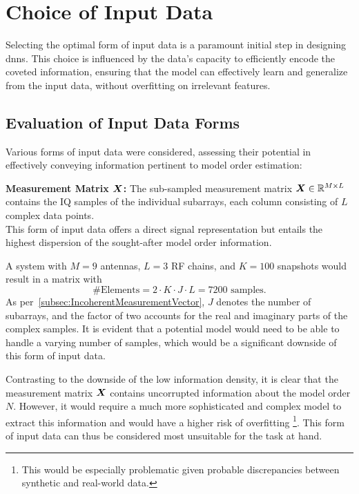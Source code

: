 \section{Choice of Input Data}

Selecting the optimal form of input data is a paramount initial step in designing \glspl{dnn}.
This choice is influenced by the data's capacity to efficiently encode the coveted information, ensuring that the model
can effectively learn and generalize from the input data, without overfitting on irrelevant features.


\subsection{Evaluation of Input Data Forms}

Various forms of input data were considered, assessing their potential in effectively conveying information pertinent to
model order estimation:

\textbf{Measurement Matrix \( \boldsymbol{X} \):}
The sub-sampled measurement matrix \( \boldsymbol{X} \in \mathbb{R}^{M \times L} \) contains the IQ samples of the
individual subarrays, each column consisting of \( L \) complex data points. \\
This form of input data offers a direct signal representation but entails the highest dispersion of the sought-after
model order information.

A system with \( M = 9 \) antennas, \( L = 3 \) RF chains, and \( K = 100 \) snapshots would result in a matrix with
\begin{equation}
    \#\text{Elements} = 2 \cdot K \cdot J \cdot L = 7200 \text{ samples.}
\end{equation}
As per~\autoref{subsec:IncoherentMeasurementVector}, \( J \) denotes the number of subarrays, and the factor of two
accounts for the real and imaginary parts of the complex samples. It is evident that a potential model would need to be able
to handle a varying number of samples, which would be a significant downside of this form of input data.

Contrasting to the downside of the low information density, it is clear that
the measurement matrix \( \boldsymbol{X} \) contains uncorrupted information about the model order \( N \). However, it would
require a much more sophisticated and complex model to extract this information and would have a higher risk of overfitting%
\footnote{This would be especially problematic given probable discrepancies between synthetic and real-world data.}.
This form of input data can thus be considered most unsuitable for the task at hand.

